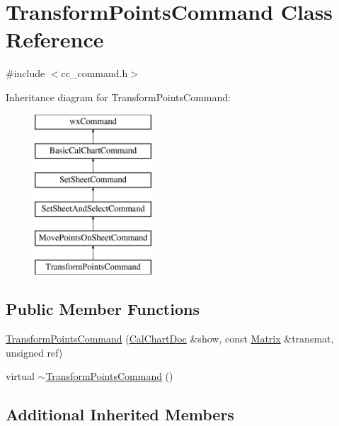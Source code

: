\hypertarget{a00148}{\section{Transform\-Points\-Command Class Reference}
\label{a00148}
}


{\ttfamily \#include $<$cc\-\_\-command.\-h$>$}

Inheritance diagram for Transform\-Points\-Command\-:\begin{figure}[H]
\begin{center}
\leavevmode
\includegraphics[height=6.000000cm]{a00148}
\end{center}
\end{figure}
\subsection*{Public Member Functions}
\begin{DoxyCompactItemize}
\item 
\hyperlink{a00148_ad44e90baab1e1f2802fc25b7506706db}{Transform\-Points\-Command} (\hyperlink{a00020}{Cal\-Chart\-Doc} \&show, const \hyperlink{a00111}{Matrix} \&transmat, unsigned ref)
\item 
virtual \hyperlink{a00148_a247408f14183f49eda3fcb44bc23e292}{$\sim$\-Transform\-Points\-Command} ()
\end{DoxyCompactItemize}
\subsection*{Additional Inherited Members}


